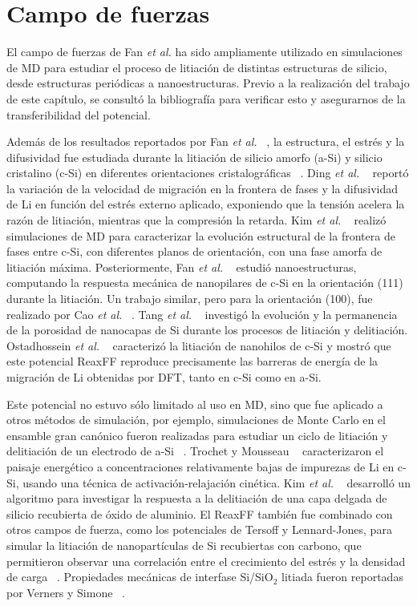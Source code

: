 \section{Campo de fuerzas}

El campo de fuerzas de Fan \textit{et al.} ha sido ampliamente utilizado en 
simulaciones de MD para estudiar el proceso de litiación de distintas estructuras
de silicio, desde estructuras periódicas a nanoestructuras. Previo a la 
realización del trabajo de este capítulo, se consultó la bibliografía para 
verificar esto y asegurarnos de la transferibilidad del potencial. 

Además de los resultados reportados por Fan \textit{et al.} ~\cite{fan2013}, 
la estructura, el estrés y la difusividad fue estudiada durante la litiación de 
silicio amorfo (a-Si) y silicio cristalino (c-Si) en diferentes orientaciones 
cristalográficas ~\cite{chen2020, kim2015}. Ding \textit{et al.} ~\cite{ding2017} 
reportó la variación de la velocidad de migración en la frontera de fases y la 
difusividad de Li en función del estrés externo aplicado, exponiendo que la 
tensión acelera la razón de litiación, mientras que la compresión la retarda. Kim 
\textit{et al.} ~\cite{kim2014} realizó simulaciones de MD para caracterizar la 
evolución estructural de la frontera de fases entre c-Si, con diferentes planos 
de orientación, con una fase amorfa de litiación máxima. Posteriormente, Fan 
\textit{et al.} ~\cite{fan2018} estudió nanoestructuras, computando la respuesta
mecánica de nanopilares de c-Si en la orientación (111) durante la litiación.
Un trabajo similar, pero para la orientación (100), fue realizado por Cao 
\textit{et al.} ~\cite{cao2019}. Tang \textit{et al.} ~\cite{tang2019} investigó
la evolución y la permanencia de la porosidad de nanocapas de Si durante los 
procesos de litiación y delitiación. Ostadhossein \textit{et al.} 
~\cite{ostadhossein2015} caracterizó la litiación de nanohilos de c-Si y mostró
que este potencial ReaxFF reproduce precisamente las barreras de energía de la
migración de Li obtenidas por DFT, tanto en c-Si como en a-Si.

Este potencial no estuvo sólo limitado al uso en MD, sino que fue aplicado a otros
métodos de simulación, por ejemplo, simulaciones de Monte Carlo en el ensamble
gran canónico fueron realizadas para estudiar un ciclo de litiación y delitiación
de un electrodo de a-Si ~\cite{basu2019}. Trochet y Mousseau ~\cite{trochet2017}
caracterizaron el paisaje energético a concentraciones relativamente bajas de 
impurezas de Li en c-Si, usando una técnica de activación-relajación cinética. 
Kim \textit{et al.} ~\cite{kim2017} desarrolló un algoritmo para investigar la 
respuesta a la delitiación de una capa delgada de silicio recubierta de óxido de 
aluminio. El ReaxFF también fue combinado con otros campos de fuerza, como los
potenciales de Tersoff y Lennard-Jones, para simular la litiación de 
nanopartículas de Si recubiertas con carbono, que permitieron observar una 
correlación entre el crecimiento del estrés y la densidad de carga 
~\cite{zheng2019,zheng2020}. Propiedades mecánicas de interfase Si/SiO$_2$ litiada 
fueron reportadas por Verners y Simone ~\cite{verners2019}. 

